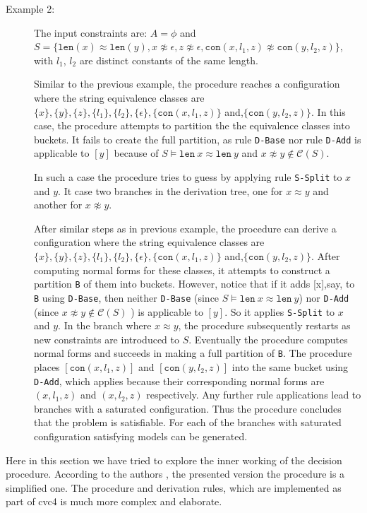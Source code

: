 \begin{description}


	
	
\end{description}
\begin{description}			
	\item[Example 2:] The input constraints are: $ A = \phi$ and $S = \{ \texttt{len}(x) \approx
	\texttt{len}(y), x \not\approx \epsilon, z \not\approx \epsilon, \texttt{con}(x, l_1, z) \not\approx \texttt{con}(y, l_2, z)\}$, with $l_1$, $l_2$ are distinct constants of the same length.
	
	
	Similar to the previous example, the procedure reaches a configuration where the string equivalence classes are $ \{x\}, \{y\}, \{z\}, \{l_1\}, \{l_2\}, \{\epsilon\},\{ \texttt{con}(x, l_1, z)\}$ and,$\{\texttt{con}(y, l_2, z)\}$.
	In this case, the procedure attempts to partition the the equivalence classes into buckets. It fails to create the full partition, as rule \texttt{D-Base}  nor rule \texttt{D-Add} is applicable to $[y]$ because of $S \models \texttt{len} \ x \approx \texttt{len} \ y$ and  $x \not\approx y \not\in \mathcal{C}(S)$.  
	
	In such a case the procedure tries to guess by applying rule \texttt{S-Split} to $x$ and $y$. It case two branches in the derivation tree, one for $x \approx y$ and another for $x \not\approx y$.  
		
	After similar steps as in previous example, the procedure can derive a configuration where the string equivalence classes are $ \{x\}, \{y\}, \{z\}, \{l_1\}, \{l_2\}, \{\epsilon\},\{ \texttt{con}(x, l_1, z)\}$ and,$\{\texttt{con}(y, l_2, z)\}$. After computing normal forms for these classes, it attempts to	construct a partition \texttt{B} of them into buckets. However, notice that if it adds {[x]},say, to \texttt{B} using \texttt{D-Base}, then neither \texttt{D-Base} (since $S \models \texttt{len} \ x \approx \texttt{len} \ y$) nor \texttt{D-Add} (since $x \not\approx y \not\in \mathcal{C}(S)$ ) is applicable to $[y]$. So it applies \texttt{S-Split} to $x$ and $y$. In the branch where $ x \approx y$, the procedure subsequently restarts as new constraints are introduced to $S$. Eventually the procedure computes normal forms and succeeds in making a full partition of \texttt{B}. The procedure places $[\texttt{con}(x, l_1, z)]$ and $[\texttt{con}(y, l_2, z)]$ into the same bucket using \texttt{D-Add}, which applies because their corresponding normal forms are $(x, l_1, z)$ and $(x, l_2, z)$ respectively. Any further rule applications lead to branches with  a saturated configuration. Thus the procedure concludes that the problem is satisfiable. For each of the branches with saturated configuration satisfying models can be generated.
\end{description}
Here in this section we have tried to explore the inner working of the decision procedure. According to the authors \cite{main-paper}, the presented version the procedure is a simplified one. The procedure and derivation rules, which are implemented as part of cvc4 is much more complex and elaborate.